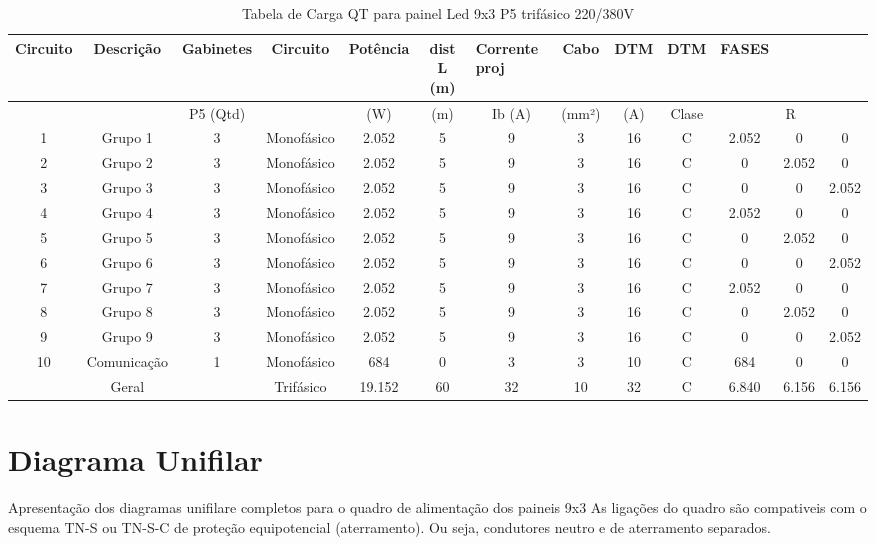 \begin{landscape}
\begin{table}[htbp]
\centering
\caption{Tabela de Carga QT para painel Led 9x3 P5 trifásico  220/380V}
\begin{tabular}{|c|c|c|c|c|c|c|c|c|c|c|c|c|}
\hline
Circuito & Descrição & Gabinetes & Circuito & Potência & dist L (m) & \multicolumn{1}{l|}{Corrente proj} & Cabo  & DTM & DTM & FASES &  &  \\ \hline
 &  & P5 (Qtd) &  &  (W) & (m) & Ib (A) & (mm²) & (A) & Clase & \multicolumn{ 3}{c|}{R} \\ \cline{ 1- 10}
1 & Grupo 1 & 3 & Monofásico & 2.052 & 5 & 9 & 3 & 16 & C & 2.052 & 0 & 0 \\ \hline
2 & Grupo 2 & 3 & Monofásico & 2.052 & 5 & 9 & 3 & 16 & C & 0 & 2.052 & 0 \\ \hline
3 & Grupo 3 & 3 & Monofásico & 2.052 & 5 & 9 & 3 & 16 & C & 0 & 0 & 2.052 \\ \hline
4 & Grupo 4 & 3 & Monofásico & 2.052 & 5 & 9 & 3 & 16 & C & 2.052 & 0 & 0 \\ \hline
5 & Grupo 5 & 3 & Monofásico & 2.052 & 5 & 9 & 3 & 16 & C & 0 & 2.052 & 0 \\ \hline
6 & Grupo 6 & 3 & Monofásico & 2.052 & 5 & 9 & 3 & 16 & C & 0 & 0 & 2.052 \\ \hline
7 & Grupo 7 & 3 & Monofásico & 2.052 & 5 & 9 & 3 & 16 & C & 2.052 & 0 & 0 \\ \hline
8 & Grupo 8 & 3 & Monofásico & 2.052 & 5 & 9 & 3 & 16 & C & 0 & 2.052 & 0 \\ \hline
9 & Grupo 9 & 3 & Monofásico & 2.052 & 5 & 9 & 3 & 16 & C & 0 & 0 & 2.052 \\ \hline
10 & Comunicação & 1 & Monofásico & 684 & 0 & 3 & 3 & 10 & C & 684 & 0 & 0 \\ \hline
 & Geral &  & Trifásico & 19.152 & 60 & 32 & 10 & 32 & C & 6.840 & 6.156 & 6.156 \\ \hline
\end{tabular}
\label{tab:carga9x3T380P5}
\end{table}
\end{landscape}


\section{Diagrama Unifilar}
Apresentação dos diagramas unifilare completos para o quadro de alimentação dos paineis 9x3
As ligações do quadro são compativeis com o esquema TN-S ou TN-S-C de proteção equipotencial (aterramento). Ou seja, condutores neutro e de aterramento separados. 


